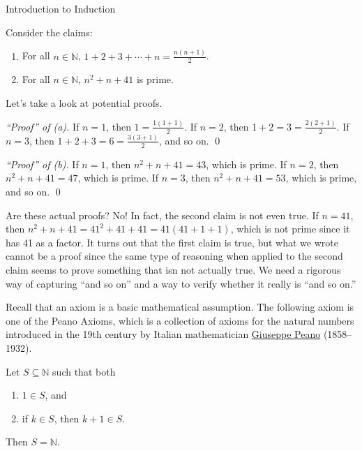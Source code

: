 \begin{section}{Introduction to Induction}\label{sec:Intro_to_Induction}

Consider the claims:
\begin{enumerate}[label=\textrm{(\alph*)}]
\item For all $n\in\mathbb{N}$, $\displaystyle 1+2+3+\cdots +n=\frac{n(n+1)}{2}$.
\item For all $n\in\mathbb{N}$, $n^{2}+n+41$ is prime.
\end{enumerate}
Let's take a look at potential proofs.

\bigskip

\noindent \emph{``Proof'' of (a).} If $n=1$, then $1=\frac{1(1+1)}{2}$.  If $n=2$, then $1+2=3=\frac{2(2+1)}{2}$.  If $n=3$, then $1+2+3=6=\frac{3(3+1)}{2}$, and so on. \hfill \qed

\bigskip

\noindent \emph{``Proof'' of (b).} If $n=1$, then $n^{2}+n+41=43$, which is prime.  If $n=2$, then $n^{2}+n+41=47$, which is prime.  If $n=3$, then $n^{2}+n+41=53$, which is prime, and so on. \hfill \qed

\bigskip

Are these actual proofs?  No!  In fact, the second claim is not even true.  If $n=41$, then $n^{2}+n+41=41^{2}+41+41=41(41+1+1)$, which is not prime since it has 41 as a factor.  It turns out that the first claim is true, but what we wrote cannot be a proof since the same type of reasoning when applied to the second claim seems to prove something that isn not actually true.  We need a rigorous way of capturing ``and so on'' and a way to verify whether it really is ``and so on.''

Recall that an axiom is a basic mathematical assumption.  The following axiom is one of the Peano Axioms, which is a collection of axioms for the natural numbers introduced in the 19th century by Italian mathematician \href{https://en.wikipedia.org/wiki/Giuseppe_Peano}{Giuseppe Peano} (1858--1932).

\begin{axiom}\label{axiom:induction}
Let $S\subseteq \mathbb{N}$ such that both
\begin{enumerate}[label=\textrm{(\roman*)}]
\item $1\in S$, and
\item if $k\in S$, then $k+1\in S$.
\end{enumerate}
Then $S=\mathbb{N}$.
\end{axiom}


\end{section}
